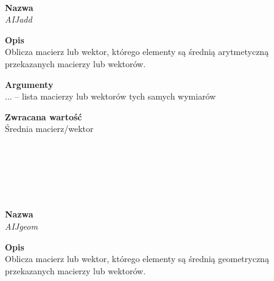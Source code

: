 \begin{spacing}{1.1}
 \\ \begin{spacing}{0.5}  \end{spacing}

\textbf{Nazwa}\\  \emph{AIJadd} \\ \begin{spacing}{0.3}  \end{spacing}
 
\textbf{Opis}\\ Oblicza macierz lub wektor, którego elementy są średnią arytmetyczną przekazanych macierzy lub wektorów.\\  \begin{spacing}{0.3}  \end{spacing}
 
\textbf{Argumenty} \\
... -- lista macierzy lub wektorów tych samych wymiarów\\ \begin{spacing}{0.3}  \end{spacing}

\textbf{Zwracana wartość}\\ Średnia macierz/wektor \\ \begin{spacing}{0.3}  \end{spacing}\\

\\~\\
\begin{spacing}{1.1}
 \\ \begin{spacing}{0.5}  \end{spacing}

\textbf{Nazwa}\\  \emph{AIJgeom} \\ \begin{spacing}{0.3}  \end{spacing}
 
\textbf{Opis}\\ Oblicza macierz lub wektor, którego elementy są średnią geometryczną przekazanych macierzy lub wektorów.\\  \begin{spacing}{0.3}  \end{spacing}
 

\end{spacing}
\end{spacing}
